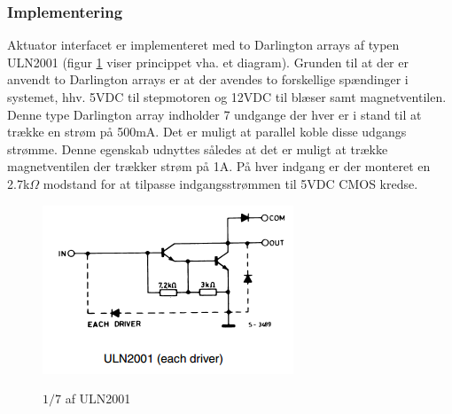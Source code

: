 \subsubsection{Implementering}
Aktuator interfacet er implementeret med to Darlington arrays af typen ULN2001 (figur \ref{fig:ULN2001_princip} viser princippet vha. et diagram). Grunden til at der er anvendt to Darlington arrays er at der avendes to forskellige spændinger i systemet, hhv. 5VDC til stepmotoren og 12VDC til blæser samt magnetventilen. 
Denne type Darlington array indholder 7 undgange der hver er i stand til at trække en strøm på 500mA. Det er muligt at parallel koble disse udgangs strømme. Denne egenskab udnyttes således at det er muligt at trække magnetventilen der trækker strøm på 1A. På hver indgang er der monteret en 2.7k$\Omega$ modstand for at tilpasse indgangsstrømmen til 5VDC CMOS kredse. 
\begin{figure}[H]
\centering
{\includegraphics[page=1,scale=0.9,trim=5mm 5mm 5mm 5mm]{./7_projektbeskrivelse/design_og_implementering/hardware/ULN2001_prencip.png}}
\caption[Figur]{$1/7$ af ULN2001}
\label{fig:ULN2001_princip}
\end{figure}